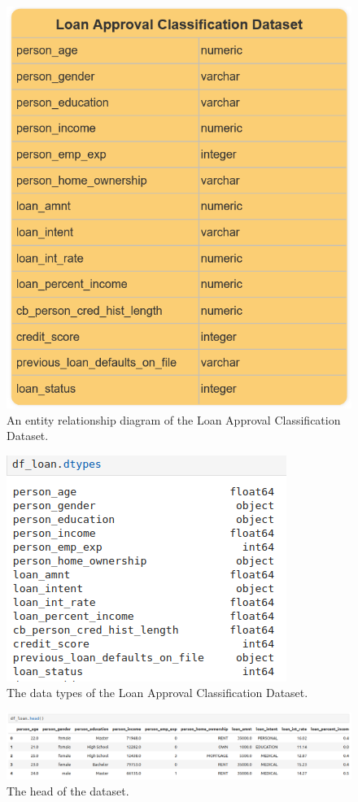 \documentclass[12pt]{report}
\begin{document}
\begin{figure}[H]
    \centering
    \includegraphics[width=.75\linewidth]{Loan-ERD.png}
    \caption{An entity relationship diagram of the Loan Approval Classification Dataset.}
    \label{fig:Loan-ERD}
\end{figure}

\begin{figure}[H]
    \centering
    \includegraphics[width=.6\linewidth]{pandas/Loan-DTypes.png}
    \caption{The data types of the Loan Approval Classification Dataset.}
    \label{fig:Loan-DTypes}
\end{figure}

\begin{figure}[H]
    \centering
    \includegraphics[width=\linewidth]{pandas/Loan-Head.png}
    \caption{The head of the dataset.}
    \label{fig:Loan-Head}
\end{figure}
\end{document}
